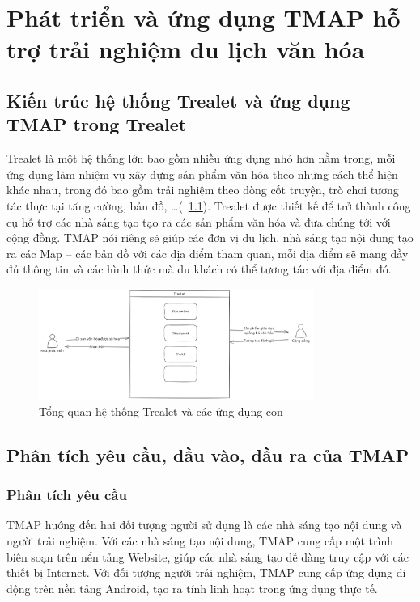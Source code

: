\chapter{Phát triển và ứng dụng TMAP hỗ trợ trải nghiệm du lịch văn hóa}

\section{Kiến trúc hệ thống Trealet và ứng dụng TMAP trong Trealet}
Trealet là một hệ thống lớn bao gồm nhiều ứng dụng nhỏ hơn nằm trong, mỗi
ứng dụng làm nhiệm vụ xây dựng sản phẩm văn hóa theo những cách thể hiện khác
nhau, trong đó bao gồm trải nghiệm theo dòng cốt truyện, trò chơi tương tác thực tại
tăng cường, bản đồ, …(\figurename~\ref{fig:trealet_overview}). Trealet được thiết kế để trở thành công cụ hỗ trợ
các nhà sáng tạo tạo ra các sản phẩm văn hóa và đưa chúng tới với cộng đồng.
TMAP nói riêng sẽ giúp các đơn vị du lịch, nhà sáng tạo nội dung tạo ra các
Map – các bản đồ với các địa điểm tham quan, mỗi địa điểm sẽ mang đầy đủ thông
tin và các hình thức mà du khách có thể tương tác với địa điểm đó.

\begin{figure}
    \centering
    \includegraphics[width=0.8\textwidth]{figures/Hinh_Kien_Truc_Trealet.png}
    \caption{Tổng quan hệ thống Trealet và các ứng dụng con}
    \label{fig:trealet_overview}
\end{figure}

\section{Phân tích yêu cầu, đầu vào, đầu ra của TMAP}
\subsection{Phân tích yêu cầu}
TMAP hướng đến hai đối tượng người sử dụng là các nhà sáng tạo nội dung và
người trải nghiệm. Với các nhà sáng tạo nội dung, TMAP cung cấp một trình biên
soạn trên nển tảng Website, giúp các nhà sáng tạo dễ dàng truy cập với các thiết bị
Internet. Với đối tượng người trải nghiệm, TMAP cung cấp ứng dụng di động trên
nền tảng Android, tạo ra tính linh hoạt trong ứng dụng thực tế.
